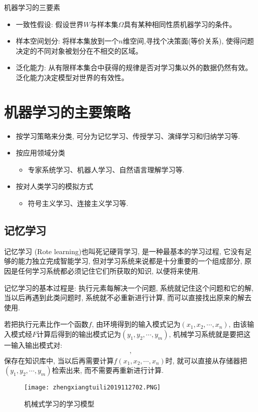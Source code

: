 机器学习的三要素
\begin{itemize}
\item 一致性假设: 假设世界$W$与样本集$\Omega$具有某种相同性质机器学习的条件。
\item 样本空间划分: 将样本集放到一个$n$维空间,寻找个决策面(等价关系), 使得问题决定的不同对象被划分在不相交的区域。
\item 泛化能力: 从有限样本集合中获得的规律是否对学习集以外的数据仍然有效。泛化能力决定模型对世界的有效性。
\end{itemize}
\section{机器学习的主要策略}
\begin{itemize}
\item 按学习策略来分类, 可分为记忆学习、传授学习、演绎学习和归纳学习等.

\item 按应用领域分类
    \begin{itemize}
      \item 专家系统学习、机器人学习、自然语言理解学习等.
    \end{itemize}
\item 按对人类学习的模拟方式  
    \begin{itemize}
      \item 符号主义学习、连接主义学习等.
    \end{itemize}
\end{itemize}
\subsection{记忆学习}

记忆学习 (Rote learning)也叫死记硬背学习, 是一种最基本的学习过程, 它没有足够的能力独立完成智能学习, 但对学习系统来说都是十分重要的一个组成部分, 原因是任何学习系统都必须记住它们所获取的知识, 以便将来使用.

记忆学习的基本过程是: 执行元素每解决一个问题, 系统就记住这个问题和它的解, 当以后再遇到此类问题时, 系统就不必重新进行计算, 而可以直接找出原来的解去使用.

若把执行元素比作一个函数$f$, 由环境得到的输入模式记为$ (x_1,x_2,\cdots ,x_n)$, 由该输入模式经$F$计算后得到的输出模式记为$ (y_1,y_2,\cdots ,y_m)$, 机械学习系统就是要把这一输入输出模式对: 
\begin{align}
    [ (x_1,x_2,\cdots ,x_n) , (y_1,y_2,\cdots ,y_m)],
\end{align}
保存在知识库中, 当以后再需要计算$f (x_1,x_2,\cdots ,x_n)$时, 就可以直接从存储器把$ (y_1,y_2,\cdots ,y_m)$检索出来, 而不需要再重新进行计算.
\begin{figure}[H]
    \centering
    \texttt{[image: zhengxiangtuili2019112702.PNG]}
    \caption{机械式学习的学习模型}
    \label{AI32fig2702}
\end{figure}
